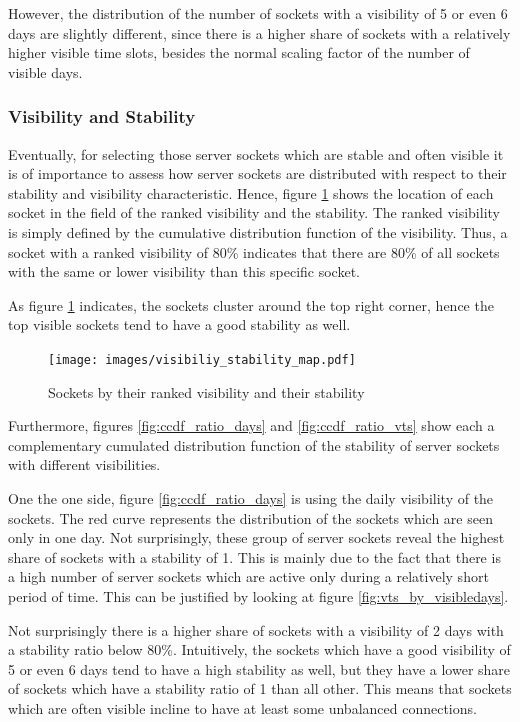 However, the distribution of the number of sockets with a visibility of 5 or
even 6 days are slightly different, since there is a higher share of sockets
with a relatively higher visible time slots, besides the normal scaling factor
of the number of visible days.

\subsubsection{Visibility and Stability}
Eventually, for selecting those \glspl{server socket} which are stable and often
visible it is of importance to assess how \glspl{server socket} are distributed
with respect to their stability and visibility characteristic. Hence, figure
\ref{fig:rankedVisibility} shows the location of each socket in the field of the
ranked visibility and the stability. The ranked visibility is simply defined by
the cumulative distribution function of the visibility. Thus, a socket with a
ranked visibility of 80\% indicates that there are 80\% of all sockets with the
same or lower visibility than this specific socket.

As figure \ref{fig:rankedVisibility} indicates, the sockets cluster around the
top right corner, hence the top visible sockets tend to have a good stability as
well.

\begin{figure}
	[hb] \centering
	\texttt{[image: images/visibiliy\_stability\_map.pdf]}
	\caption{Sockets by their ranked visibility and their stability}
	\label{fig:rankedVisibility}
\end{figure}

Furthermore, figures \ref{fig:ccdf_ratio_days} and \ref{fig:ccdf_ratio_vts} show
each a complementary cumulated distribution function of the stability of server
sockets with different visibilities.

One the one side, figure \ref{fig:ccdf_ratio_days} is using the daily visibility
of the sockets. The red curve represents the distribution of the sockets which
are seen only in one day. Not surprisingly, these group of \glspl{server socket}
reveal the highest share of sockets with a stability of 1. This is mainly due to
the fact that there is a high number of \glspl{server socket} which are active
only during a relatively short period of time. This can be justified by looking
at figure \ref{fig:vts_by_visibledays}.

Not surprisingly there is a higher share of sockets with a visibility of 2 days
with a stability ratio below 80\%. Intuitively, the sockets which have a good
visibility of 5 or even 6 days tend to have a high stability as well, but they
have a lower share of sockets which have a stability ratio of 1 than all other.
This means that sockets which are often visible incline to have at least some
unbalanced connections.

